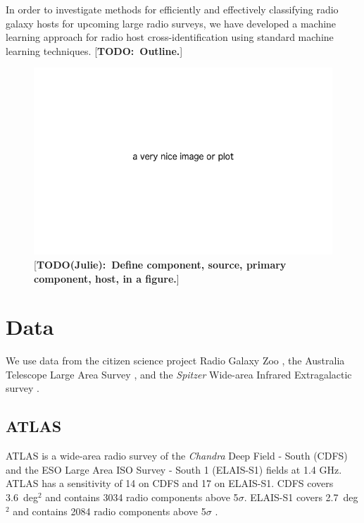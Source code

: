 \documentclass[fleqn,usenatbib,usedcolumn]{mnras}
\newcommand{\jansky}{\text{Jy}}
\newcommand{\matthew}[2]{ {\color{white!20!violet}[{\bf TODO(#1):~{#2}}]} }
\newcommand{\todo}[1]{ {\color{red}[{\bf TODO:~{#1}}]} }
\begin{document}

  In order to investigate methods for efficiently and effectively classifying
  radio galaxy hosts for upcoming large radio surveys, we have developed a
  machine learning approach for radio host cross-identification using standard
  machine learning techniques. \todo{Outline.}

  \begin{figure}
    \includegraphics[width=\linewidth]{images/placeholder.png}
    \caption{\matthew{Julie}{Define component, source, primary component, host, in a figure.}}
  \end{figure}

\section{Data}\label{data}
    
  We use data from the citizen science project Radio Galaxy Zoo
  \citep{banfield15}, the Australia Telescope Large Area Survey
  \citep[ATLAS;][]{franzen15}, and the \emph{Spitzer} Wide-area Infrared
  Extragalactic survey \citep[SWIRE;][]{lonsdale03swire, surace05swire}.

  \subsection{ATLAS}\label{sec:atlas}

    ATLAS \citep{franzen15} is a wide-area radio survey of the \emph{Chandra}
    Deep Field - South (CDFS) and the ESO Large Area ISO Survey - South 1
    (ELAIS-S1) fields at 1.4 GHz. ATLAS has a sensitivity of
    \unit{14}{\micro\jansky} on CDFS and \unit{17}{\micro\jansky} on ELAIS-S1.
    CDFS covers 3.6~deg$^2$ and contains 3034 radio components above 5$\sigma$.
    ELAIS-S1 covers 2.7~deg$^2$ and contains 2084 radio components above
    5$\sigma$ \citep{franzen15}.
\end{document}
